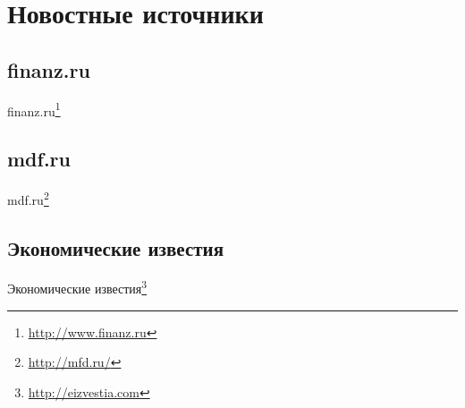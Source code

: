 \section{Новостные источники}

\subsection{finanz.ru}

finanz.ru\footnote{\url{http://www.finanz.ru}}

\subsection{mdf.ru}

mdf.ru\footnote{\url{http://mfd.ru/}}

\subsection{Экономические известия}

Экономические известия\footnote{\url{http://eizvestia.com}}